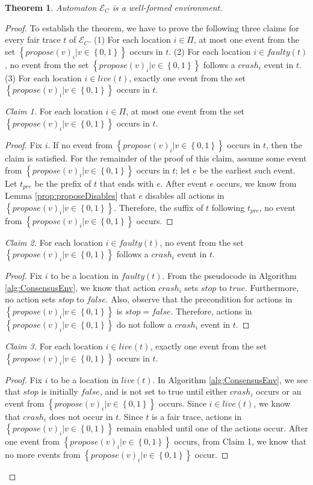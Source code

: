 \documentclass[11pt]{article}
\newtheorem{theorem}{Theorem}
\numberwithin{theorem}{section}
\newcommand{\set}[1]{\left\{#1\right\}}
\begin{document}
\begin{theorem}\label{thm:environmentWellFormed}
 Automaton $\mathcal{E}_C$ is a well-formed environment.
\end{theorem}
\begin{proof}
 To establish the theorem, we have to prove the following three claims for every fair trace $t$ of $\mathcal{E}_C$. (1) For each location $i \in \Pi$, at most one event from the set $\set{propose(v)_i| v \in \set{0,1}}$ occurs in $t$. (2) For each location $i \in faulty(t)$, no event from the set $\set{propose(v)_i| v \in \set{0,1}}$ follows a $crash_i$ event in $t$. (3) For each location $i \in live(t)$, exactly one event from the set $\set{propose(v)_i| v \in \set{0,1}}$ occurs in $t$.
 
 \textit{Claim 1.} For each location $i \in \Pi$, at most one event from the set $\set{propose(v)_i| v \in \set{0,1}}$ occurs in $t$.
 \begin{proof}
 Fix $i$.
 If no event from $\set{propose(v)_i| v \in \set{0,1}}$ occurs in $t$, then the claim is satisfied. For the remainder of the proof of this claim, assume some event from $\set{propose(v)_i| v \in \set{0,1}}$ occurs in $t$; let $e$ be the earliest such event. Let $t_{pre}$ be the prefix of $t$ that ends with $e$. After event $e$ occurs, we know from Lemma \ref{prop:proposeDisables} that $e$ disables all actions in  $\set{propose(v)_i| v \in \set{0,1}}$. Therefore, the suffix of $t$ following $t_{pre}$, no event from $\set{propose(v)_i| v \in \set{0,1}}$ occurs.
 \end{proof}
 
 \textit{Claim 2.} For each location $i \in faulty(t)$, no event from the set $\set{propose(v)_i| v \in \set{0,1}}$ follows a $crash_i$ event in $t$.
 \begin{proof}
 Fix $i$ to be a location in $faulty(t)$. From the pseudocode in Algorithm \ref{alg:ConsensusEnv}, we know that action $crash_i$ sets $stop$ to $true$. Furthermore, no action sets $stop$ to $false$. Also, observe that the precondition for actions in  $\set{propose(v)_i| v \in \set{0,1}}$ is $stop=false$. Therefore, actions in $\set{propose(v)_i| v \in \set{0,1}}$ do not follow a $crash_i$ event in $t$.
 \end{proof}
 
 \textit{Claim 3.}
 For each location $i \in live(t)$, exactly one event from the set $\set{propose(v)_i| v \in \set{0,1}}$ occurs in $t$.
 
 \begin{proof}
 Fix $i$ to be a location in $live(t)$.  In Algorithm \ref{alg:ConsensusEnv}, we see that $stop$ is initially $false$, and is not set to true until either $crash_i$ occurs or an event from $\set{propose(v)_i| v \in \set{0,1}}$ occurs. Since $i \in live(t)$, we know that $crash_i$ does not occur in $t$.
 Since $t$ is a fair trace, actions in $\set{propose(v)_i| v \in \set{0,1}}$ remain enabled until one of the actions occur. After one event from $\set{propose(v)_i| v \in \set{0,1}}$ occurs, from Claim 1, we know that no more events from $\set{propose(v)_i| v \in \set{0,1}}$ occur.
 \end{proof}
 

\end{proof}
\end{document}
